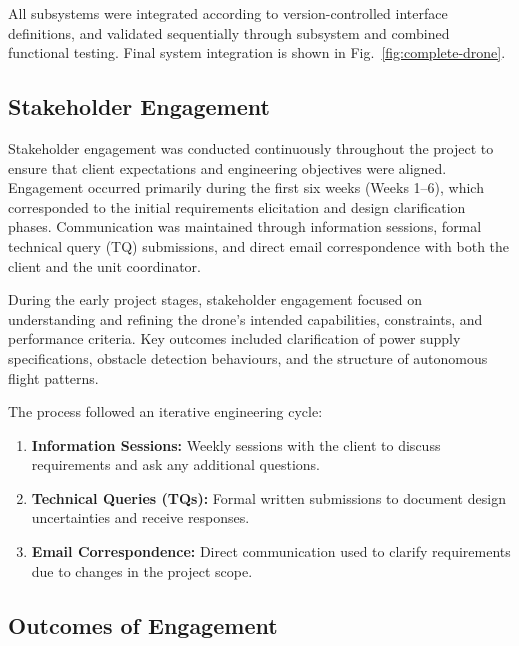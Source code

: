 \noindent All subsystems were integrated according to version-controlled interface definitions, and validated sequentially through subsystem and combined functional testing. Final system integration is shown in Fig.~\ref{fig:complete-drone}.



\pagebreak
\subsection{Stakeholder Engagement}
Stakeholder engagement was conducted continuously throughout the project to ensure that client expectations and engineering objectives were aligned. Engagement occurred primarily during the first six weeks (Weeks 1–6), which corresponded to the initial requirements elicitation and design clarification phases. Communication was maintained through information sessions, formal technical query (TQ) submissions, and direct email correspondence with both the client and the unit coordinator.

During the early project stages, stakeholder engagement focused on understanding and refining the drone’s intended capabilities, constraints, and performance criteria. Key outcomes included clarification of power supply specifications, obstacle detection behaviours, and the structure of autonomous flight patterns. 

The process followed an iterative engineering cycle:
\begin{enumerate}
    \item \textbf{Information Sessions:} Weekly sessions with the client to discuss requirements and ask any additional questions.
    \item \textbf{Technical Queries (TQs):} Formal written submissions to document design uncertainties and receive responses.
    \item \textbf{Email Correspondence:} Direct communication used to clarify requirements due to changes in the project scope.
\end{enumerate}

\subsection{Outcomes of Engagement}

